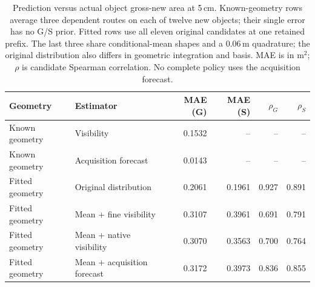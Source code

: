 \begin{table}[!htbp]
\centering\small
\caption{Prediction versus actual object gross-new area at 5\,cm. Known-geometry rows average three dependent routes on each of twelve new objects; their single error has no G/S prior. Fitted rows use all eleven original candidates at one retained prefix. The last three share conditional-mean shapes and a 0.06\,m quadrature; the original distribution also differs in geometric integration and basis. MAE is in m$^2$; $\rho$ is candidate Spearman correlation. No complete policy uses the acquisition forecast.}
\label{tab:acquisition-alignment}
\begin{tabular}{llrrrr}
\toprule
Geometry & Estimator & MAE (G) & MAE (S) & $\rho_G$ & $\rho_S$ \\
\midrule
Known geometry & Visibility & 0.1532 & -- & -- & -- \\
Known geometry & Acquisition forecast & 0.0143 & -- & -- & -- \\
Fitted geometry & Original distribution & 0.2061 & 0.1961 & 0.927 & 0.891 \\
Fitted geometry & Mean + fine visibility & 0.3107 & 0.3961 & 0.691 & 0.791 \\
Fitted geometry & Mean + native visibility & 0.3070 & 0.3563 & 0.700 & 0.764 \\
Fitted geometry & Mean + acquisition forecast & 0.3172 & 0.3973 & 0.836 & 0.855 \\
\bottomrule
\end{tabular}
\end{table}
